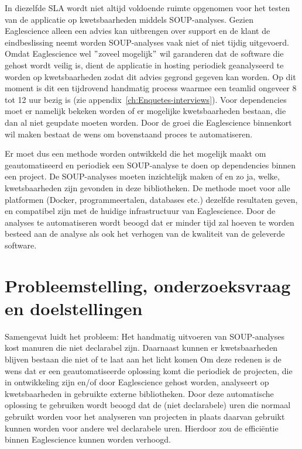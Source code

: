 In diezelfde SLA wordt niet altijd voldoende ruimte opgenomen voor het testen van de applicatie op kwetsbaarheden middels SOUP-analyses. Gezien Eaglescience alleen een advies kan uitbrengen over support en de klant de eindbeslissing neemt worden SOUP-analyses vaak niet of niet tijdig uitgevoerd. Omdat Eaglescience wel $"$zoveel mogelijk$"$ wil garanderen dat de software die gehost wordt veilig is, dient de applicatie in hosting periodiek geanalyseerd te worden op kwetsbaarheden zodat dit advies gegrond gegeven kan worden. Op dit moment is dit een tijdrovend handmatig process waarmee een teamlid ongeveer 8 tot 12 uur bezig is (zie appendix~\ref{ch:Enquetes-interviews}). Voor dependencies moet er namelijk bekeken worden of er mogelijke kwetsbaarheden bestaan, die dan al niet geupdate moeten worden. Door de groei die Eaglescience binnenkort wil maken bestaat de wens om bovenstaand proces te automatiseren.

Er moet dus een methode worden ontwikkeld die het mogelijk maakt om geautomatiseerd en periodiek een SOUP-analyse te doen op dependencies binnen een project. De SOUP-analyses moeten inzichtelijk maken of en zo ja, welke, kwetsbaarheden zijn gevonden in deze bibliotheken. De methode moet voor alle platformen (Docker, programmeertalen, databases etc.) dezelfde resultaten geven, en compatibel zijn met de huidige infrastructuur van Eaglescience. Door de analyses te automatiseren wordt beoogd dat er minder tijd zal hoeven te worden besteed aan de analyse als ook het verhogen van de kwaliteit van de geleverde software.

\section{Probleemstelling, onderzoeksvraag en doelstellingen}\label{sec:probleem-stelling-onderzoeksvraag-en-doelstellingen}
Samengevat luidt het probleem: Het handmatig uitvoeren van SOUP-analyses kost manuren die niet declarabel zijn. Daarnaast kunnen er kwetsbaarheden blijven bestaan die niet of te laat aan het licht komen
Om deze redenen is de wens dat er een geautomatiseerde oplossing komt die periodiek de projecten, die in ontwikkeling zijn en/of door Eaglescience gehost worden, analyseert op kwetsbaarheden in gebruikte externe bibliotheken. Door deze automatische oplossing te gebruiken wordt beoogd dat de (niet declarabele) uren die normaal gebruikt worden voor het analyseren van projecten in plaats daarvan gebruikt kunnen worden voor andere wel declarabele uren. Hierdoor zou de efficiëntie binnen Eaglescience kunnen worden verhoogd.


